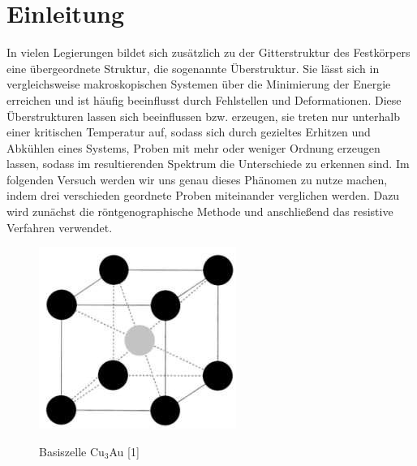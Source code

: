 \section{Einleitung}
    In vielen Legierungen bildet sich zusätzlich zu der Gitterstruktur des Festkörpers eine übergeordnete
    Struktur, die sogenannte Überstruktur. Sie lässt sich in vergleichsweise makroskopischen Systemen
    über die Minimierung der Energie erreichen und ist häufig beeinflusst durch Fehlstellen und Deformationen.
    Diese Überstrukturen lassen sich beeinflussen bzw. erzeugen, sie treten nur unterhalb einer kritischen
    Temperatur auf, sodass sich durch gezieltes Erhitzen und Abkühlen eines Systems, Proben mit mehr
    oder weniger Ordnung erzeugen lassen, sodass im resultierenden Spektrum die Unterschiede zu erkennen sind.
    Im folgenden Versuch werden wir uns genau dieses Phänomen zu nutze machen, indem drei verschieden geordnete
    Proben miteinander verglichen werden. Dazu wird zunächst die röntgenographische Methode und anschließend
    das resistive Verfahren verwendet.

    \begin{figure}[H]
        \centering
        \includegraphics{images/einleitung_hurensohn.jpg}
        \label{einleitung}
        \caption{Basiszelle Cu$_3$Au [1]}
    \end{figure}